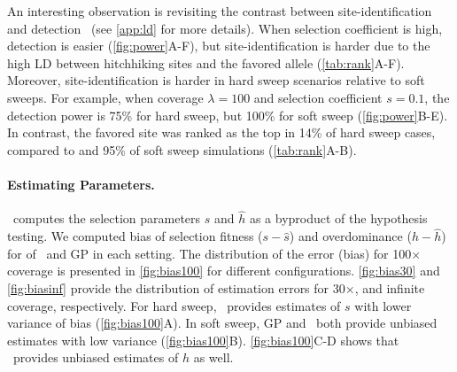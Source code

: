 An interesting observation is revisiting the contrast between 
site-identification
and detection~\cite{long2013massive,tobler2014massive} (see \ref{app:ld} for 
more details). 
When selection 
coefficient is high, detection is easier
(\ref{fig:power}A-F), but site-identification is harder due to
the high LD between hitchhiking sites and the favored allele
(\ref{tab:rank}A-F).  Moreover, site-identification is harder in
hard sweep scenarios relative to soft sweeps. For example, when
coverage $\lambda=100$ and selection coefficient $s=0.1$, the
detection power is 75\% for hard sweep, but 100\% for soft sweep
(\ref{fig:power}B-E). In contrast, the favored site was ranked as
the top in 14\% of hard sweep cases, compared to and 95\% of soft
sweep simulations (\ref{tab:rank}A-B).  
\paragraph{Estimating Parameters.}
\comale\ computes the selection parameters $\hat{s}$ and $\hat{h}$ as
a byproduct of the hypothesis testing. We computed bias of selection
fitness ($s-\hat{s}$) and overdominance ($h-\hat{h}$) for of \comale\
and GP in each setting. The distribution of the error (bias) for
100$\times$ coverage is presented in \ref{fig:bias100} for
different configurations.
\ref{fig:bias30} and \ref{fig:biasinf} provide the
distribution of estimation errors for 30$\times$, and infinite
coverage, respectively.  For hard sweep, \comale\ provides estimates
of $s$ with lower variance of bias (\ref{fig:bias100}A). In soft
sweep, GP and \comale\ both provide unbiased estimates with low
variance (\ref{fig:bias100}B). \ref{fig:bias100}C-D shows
that \comale\ provides unbiased estimates of $h$ as well.

